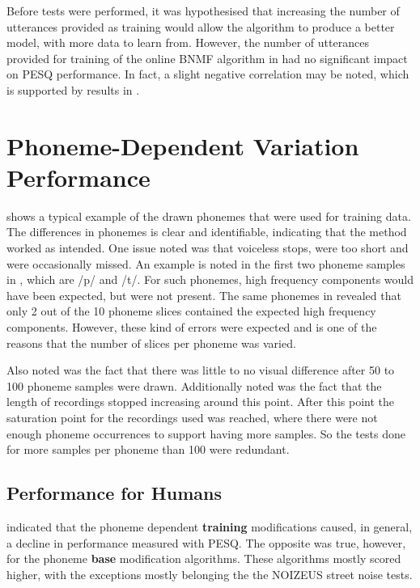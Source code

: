 Before tests were performed, it was hypothesised that increasing the
number of utterances provided as training would allow the algorithm
to produce a better model, with more data to learn from. However,
the number of utterances provided for training of the online \ac{BNMF}
algorithm in  had no significant impact on
\ac{PESQ} performance. In fact, a slight negative correlation may
be noted, which is supported by results in .

\clearpage{}


\section{Phoneme-Dependent Variation Performance}

 shows a typical example of the
drawn phonemes that were used for training data. The differences in
phonemes is clear and identifiable, indicating that the method worked
as intended. One issue noted was that voiceless stops, were too short
and were occasionally missed. An example is noted in the first two
phoneme samples in , which are /p/ and
/t/. For such phonemes, high frequency components would have been
expected, but were not present. The same phonemes in 
revealed that only 2 out of the 10 phoneme slices contained the expected
high frequency components. However, these kind of errors were expected
and is one of the reasons that the number of slices per phoneme was
varied.

Also noted was the fact that there was little to no visual difference
after 50 to 100 phoneme samples were drawn. Additionally noted was
the fact that the length of recordings stopped increasing around this
point. After this point the saturation point for the recordings used
was reached, where there were not enough phoneme occurrences to support
having more samples. So the tests done for more samples per phoneme
than 100 were redundant.


\subsection{Performance for Humans}

 indicated that the phoneme dependent
\textbf{training} modifications caused, in general, a decline in performance
measured with \ac{PESQ}. The opposite was true, however, for the
phoneme \textbf{base} modification algorithms. These algorithms mostly
scored higher, with the exceptions mostly belonging the the NOIZEUS
street noise tests.

